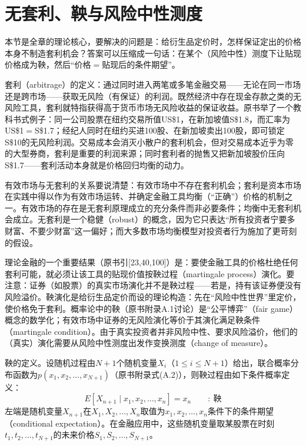 \section{无套利、鞅与风险中性测度}

本节是全章的理论核心，要解决的问题是：给衍生品定价时，怎样保证定出的价格本身不制造套利机会？答案可以压缩成一句话：在某个（风险中性）测度下让贴现价格成为鞅，然后“价格$=$贴现后的条件期望”。

套利（arbitrage）的定义：通过同时进入两笔或多笔金融交易——无论在同一市场还是跨市场——获取无风险（有保证）的利润。既然经济中存在现金存款之类的无风险工具，套利就特指获得高于货币市场无风险收益的保证收益。原书举了一个教科书式例子：同一公司股票在纽约交易所值US\$1，在新加坡值S\$1.8，而汇率为US\$1$=$S\$1.7；经纪人同时在纽约买进100股、在新加坡卖出100股，即可锁定S\$10的无风险利润。交易成本会消灭小散户的套利机会，但对交易成本近乎为零的大型券商，套利是重要的利润来源；同时套利者的抛售又把新加坡股价压向S\$1.7——套利活动本身就是价格回归均衡的动力。

有效市场与无套利的关系要说清楚：有效市场中不存在套利机会；套利是资本市场在实践中得以作为有效市场运转、并确定金融工具均衡（“正确”）价格的机制之一。有效市场的存在是无套利原理成立的充分条件而非必要条件；均衡中无套利机会成立。无套利是一个稳健（robust）的概念，因为它只表达“所有投资者宁要多财富、不要少财富”这一偏好；而大多数市场均衡模型对投资者行为施加了更苛刻的假设。

理论金融的一个重要结果（原书引[23,40,100]）是：要使金融工具的价格杜绝任何套利可能，就必须让该工具的贴现价值按鞅过程（martingale process）演化。要注意：证券（如股票）的真实市场演化并不是鞅过程——若是，持有该证券便没有风险溢价。鞅演化是给衍生品定价而设的理论构造：先在“风险中性世界”里定价，使价格免于套利。概率论中的鞅（原书附录A.1讨论）是“公平博弈”（fair game）概念的数学化；有效市场中证券的无风险演化等价于其演化满足鞅条件（martingale condition）。由于真实投资者并非风险中性、要求风险溢价，他们的（真实）演化需要从风险中性测度出发作变换测度（change of measure）。

鞅的定义。设随机过程由$N+1$个随机变量$X_i$（$1\le i\le N+1$）给出，联合概率分布函数为$p(x_1,x_2,\ldots,x_{N+1})$（原书附录式(A.2)），则鞅过程由如下条件概率定义：
\begin{equation*}
E\!\left[X_{n+1}\mid x_1,x_2,\ldots,x_n\right]=x_n
\qquad:\ \text{鞅}
\tag{2.2}
\end{equation*}
左端是随机变量$X_{n+1}$在$X_1,X_2,\ldots,X_n$取值为$x_1,x_2,\ldots,x_n$条件下的条件期望（conditional expectation）。在金融应用中，这些随机变量取某股票在时刻$t_1,t_2,\ldots,t_{N+1}$的未来价格$S_1,S_2,\ldots,S_{N+1}$。

